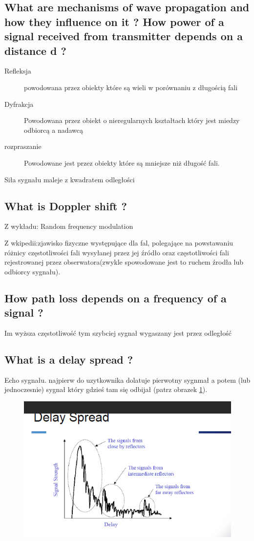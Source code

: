 \subsection{What are mechanisms of wave propagation and how they influence on it ? How power of a signal received from transmitter depends on a distance d ?}
\begin{description}
\item[Refleksja] powodowana przez obiekty które są wieli w porównaniu z długością fali
\item[Dyfrakcja]Powodowana przez obiekt o nieregularnych kształtach który jest miedzy odbiorcą a nadawcą
\item[rozpraszanie] Powodowane jest przez obiekty które są mniejsze niż długość fali.
\end{description}
Siła sygnału maleje z kwadratem odległości


\subsection{What is Doppler shift ?}
Z wykładu: Random frequency modulation


Z wkipedii:zjawisko fizyczne występujące dla fal, polegające na powstawaniu różnicy częstotliwości fali wysyłanej przez jej źródło oraz częstotliwości fali rejestrowanej przez obserwatora(zwykle spowodowane jest to ruchem źrodła lub odbiorcy sygnału).



\subsection{How path loss depends on a frequency of a signal ?}
Im wyższa częstotliwość tym szybciej sygnał wygaszany jest przez odległość
\subsection{What is a delay spread ?}

Echo sygnału. najpierw do uzytkownika dolatuje pierwotny sygnmał a potem (lub jednoczesnie) sygnał który gdzieś tam się odbijał (patrz obrazek \ref{zdj:delay}).
\begin{figure}

\caption{}
\label{zdj:delay}
\centering
\includegraphics[width=\textwidth]{zdjecia/delay}
\end{figure}

